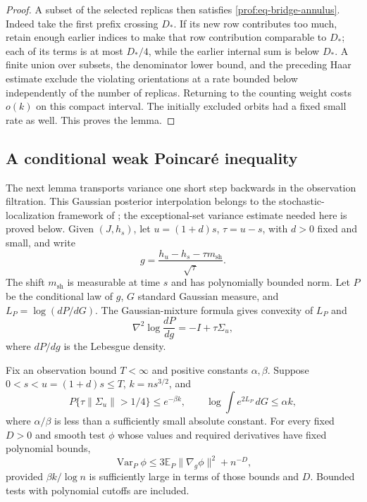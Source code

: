 \begin{proof}
A subset of the selected replicas then satisfies
\eqref{prof:eq-bridge-annulus}.  Indeed take the first prefix crossing
\(D_*\).  If its new row contributes too much, retain enough earlier
indices to make that row contribution comparable to \(D_*\); each of its
terms is at most \(D_*/4\), while the earlier internal sum is below
\(D_*\).  A finite union over subsets, the denominator lower bound, and
the preceding Haar estimate exclude the violating orientations at a rate
bounded below independently of the number of replicas.  Returning to the
counting weight costs \(o(k)\) on this compact interval.  The initially
excluded orbits had a fixed small rate as well.  This proves the lemma.
\end{proof}

\subsection{A conditional weak Poincar\'e inequality}
\label{prof:sec-conditional-variance}

The next lemma transports variance one short step backwards in the
observation filtration.  This Gaussian posterior interpolation belongs
to the stochastic-localization framework of
\citet{Eldan2013StochasticLocalization,ChenEldan2025Localization};
the exceptional-set variance estimate needed here is proved below.
Given \((J,h_s)\), let \(u=(1+d)s\),
\(\tau=u-s\), with \(d>0\) fixed and small, and write
\[
 g=\frac{h_u-h_s-\tau m_{\mathrm{sh}}}{\sqrt\tau}.
\]
The shift \(m_{\mathrm{sh}}\) is measurable at time \(s\) and has
polynomially bounded norm.  Let \(P\) be the conditional law of \(g\),
\(G\) standard Gaussian measure, and \(L_P=\log(dP/dG)\).
The Gaussian-mixture formula gives convexity of \(L_P\) and
\[
 \nabla^2\log\frac{dP}{dg}=-I+\tau\Sigma_u,
\]
where \(dP/dg\) is the Lebesgue density.

\begin{lemma}
\label{prof:lem-conditional-variance}
Fix an observation bound \(T<\infty\) and positive constants
\(\alpha,\beta\). Suppose \(0<s<u=(1+d)s\le T\),
\(k=ns^{3/2}\), and
\begin{equation}
 P\{\tau\|\Sigma_u\|>1/4\}\le e^{-\beta k},
 \qquad
 \log\int e^{2L_P}\,dG\le\alpha k,
 \label{prof:eq20}
\end{equation}
where \(\alpha/\beta\) is less than a sufficiently small absolute
constant.  For every fixed \(D>0\) and smooth test \(\phi\) whose values
and required derivatives have fixed polynomial bounds,
\begin{equation}
 \operatorname{Var}_P\phi
 \le3\mathbb E_P\|\nabla_g\phi\|^2+n^{-D},
 \label{prof:eq21}
\end{equation}
provided \(\beta k/\log n\) is sufficiently large in terms of those
bounds and \(D\).  Bounded tests with polynomial cutoffs are included.
\end{lemma}

